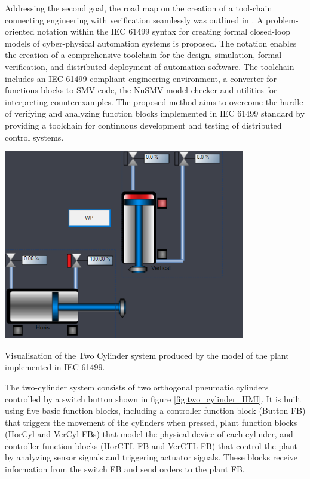 \documentclass[runningheads]{llncs}
\begin{document}
Addressing the second goal, the road map on the creation of a tool-chain connecting engineering with verification seamlessly was outlined in  \cite{vyatkin2008closed}.  A problem-oriented notation within the IEC 61499 syntax for creating formal closed-loop models of cyber-physical automation systems \cite{xavier2021cyber} is proposed. The notation enables the creation of a comprehensive toolchain for the design, simulation, formal verification, and distributed deployment of automation software. The toolchain includes an IEC 61499-compliant engineering environment, a converter for functions blocks to SMV code, the NuSMV model-checker and utilities for interpreting counterexamples. The proposed method aims to overcome the hurdle of verifying and analyzing function blocks implemented in IEC 61499 standard by providing a toolchain for continuous development and testing of distributed control systems. 



\begin {figure*}
    \centering
    \includegraphics [width = 0.5 \textwidth] {images/Two_Cylinder.PNG}
    \caption {Visualisation of the Two Cylinder system produced by the model of the plant implemented in IEC 61499.}
    \label {fig:two_cylinder_HMI}
\end {figure*}

The two-cylinder system  consists of two orthogonal pneumatic cylinders controlled by a switch button shown in figure \ref{fig:two_cylinder_HMI}. It is built using five basic function blocks, including a controller function block (Button FB) that triggers the movement of the cylinders when pressed, plant function blocks (HorCyl and VerCyl FBs) that model the physical device of each cylinder, and controller function blocks (HorCTL FB and VerCTL FB) that control the plant by analyzing sensor signals and triggering actuator signals. These blocks receive information from the switch FB and send orders to the plant FB.
\end{document}
